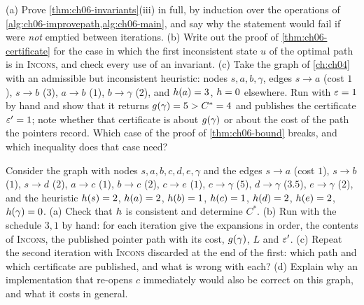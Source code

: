 \begin{exercise}
\label{exr:ch06-proof}
(a) Prove \cref{thm:ch06-invariants}(iii) in full, by induction over the
operations of \cref{alg:ch06-improvepath,alg:ch06-main}, and say why the
statement would fail if \Closed were \emph{not} emptied between iterations.
(b) Write out the proof of \cref{thm:ch06-certificate} for the case in which
the first inconsistent state $u$ of the optimal path is in \textsc{Incons},
and check every use of an invariant. (c) Take the graph of \cref{ch:ch04}
with an admissible but inconsistent heuristic: nodes $s, a, b, \gamma$, edges
$s \to a$ (cost $1$), $s \to b$ ($3$), $a \to b$ ($1$), $b \to \gamma$ ($2$),
and $h(a) = 3$, $h = 0$ elsewhere. Run \AraImprovePath with
$\varepsilon = 1$ by hand and show that it returns $g(\gamma) = 5 > C^* = 4$
and publishes the certificate $\varepsilon' = 1$; note whether that certificate is
about $g(\gamma)$ or about the cost of the path the pointers record.
Which case of the proof of
\cref{thm:ch06-bound} breaks, and which inequality does that case need?
\end{exercise}

\begin{exercise}[\difficulty{2}]
\label{exr:ch06-incons}
Consider the graph with nodes $s, a, b, c, d, e, \gamma$ and the edges
$s \to a$ (cost $1$), $s \to b$ ($1$), $s \to d$ ($2$), $a \to c$ ($1$),
$b \to c$ ($2$), $c \to e$ ($1$), $c \to \gamma$ ($5$), $d \to \gamma$ ($3.5$),
$e \to \gamma$ ($2$), and the heuristic $h(s) = 2$, $h(a) = 2$,
$h(b) = 1$, $h(c) = 1$, $h(d) = 2$, $h(e) = 2$,
$h(\gamma) = 0$. (a) Check that $h$ is consistent and determine
$C^*$. (b) Run \arastar with the schedule $3, 1$ by hand: for each iteration
give the expansions in order, the contents of \textsc{Incons}, the published
pointer path with its cost, $g(\gamma)$, $L$ and $\varepsilon'$. (c) Repeat
the second iteration with \textsc{Incons} discarded at the end of the first:
which path and which certificate are published, and what is wrong with
each? (d) Explain why an implementation that re-opens $c$ immediately would
also be correct on this graph, and what it costs in general.
\end{exercise}

